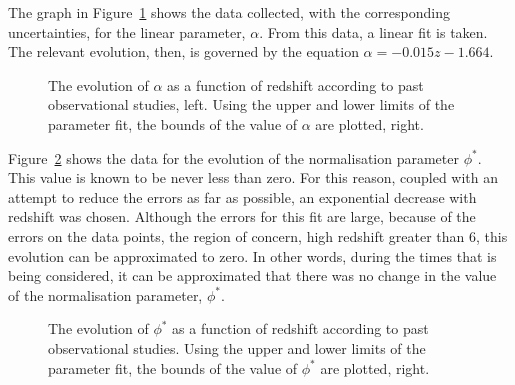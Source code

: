 			The graph in Figure~\ref{fig:alpha_evolution} shows the data collected, with the corresponding uncertainties, for the linear parameter, $\alpha$. From this data, a linear fit is taken. The relevant evolution, then, is governed by the equation $\alpha = -0.015z - 1.664$.
			\begin{figure}[htbp]
				\begin{minipage}[c]{0.5\linewidth}
					\centering
						\begingroup{}
							\resizebox{\textwidth}{!}{%
								
							}\endgroup
				\end{minipage}
				\begin{minipage}[c]{0.5\linewidth}
					\centering
						\begingroup{}
							\resizebox{\textwidth}{!}{%
								
							}\endgroup
				\end{minipage}
				\caption{The evolution of $\alpha$ as a function of redshift according to past observational studies, left. Using the upper and lower limits of the parameter fit, the bounds of the value of $\alpha$ are plotted, right.\label{fig:alpha_evolution}}
			\end{figure}

			Figure~\ref{fig:phi_evolution} shows the data for the evolution of the normalisation parameter $\phi^{*}$. This value is known to be never less than zero. For this reason, coupled with an attempt to reduce the errors as far as possible, an exponential decrease with redshift was chosen. Although the errors for this fit are large, because of the errors on the data points, the region of concern, high redshift greater than 6, this evolution can be approximated to zero. In other words, during the times that is being considered, it can be approximated that there was no change in the value of the normalisation parameter, $\phi^*$.
			\begin{figure}[htbp]
				\begin{minipage}[c]{0.5\linewidth}
					\centering
						\begingroup{}
							\resizebox{\textwidth}{!}{%
								
							}\endgroup
				\end{minipage}
				\begin{minipage}[c]{0.5\linewidth}
					\centering
						\begingroup{}
							\resizebox{\textwidth}{!}{%
								
							}\endgroup
				\end{minipage}
				\caption{The evolution of $\phi^{*}$ as a function of redshift according to past observational studies. Using the upper and lower limits of the parameter fit, the bounds of the value of $\phi^*$ are plotted, right.\label{fig:phi_evolution}}
			\end{figure}

